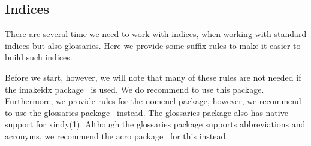 \subsection{Indices}

There are several time we need to work with indices, \eg when working with 
standard indices but also glossaries.
Here we provide some suffix rules to make it easier to build such indices.

Before we start, however, we will note that many of these rules are not needed 
if the {\Tt{}imakeidx\nwendquote} package~\cite{imakeidx} is used.
We do recommend to use this package.
Furthermore, we provide rules for the {\Tt{}nomencl\nwendquote} package, however, we 
recommend to use the {\Tt{}glossaries\nwendquote} package~\cite{glossaries} instead.
The {\Tt{}glossaries\nwendquote} package also has native support for xindy(1).
Although the {\Tt{}glossaries\nwendquote} package supports abbreviations and acronyms, we 
recommend the {\Tt{}acro\nwendquote} package~\cite{acro} for this instead.

